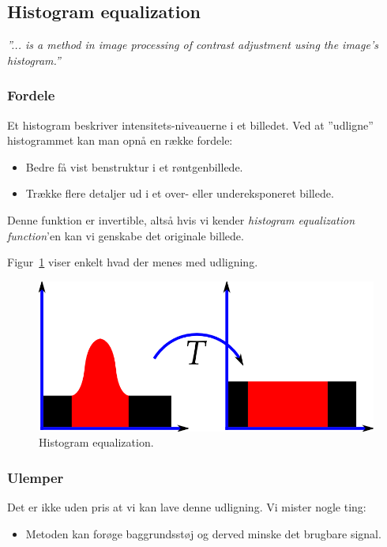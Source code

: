 \subsection{Histogram equalization}

\begin{center}
	\textit{''... is a method in image processing of contrast adjustment using the image's histogram.''}
\end{center}

\subsubsection{Fordele}

Et histogram beskriver intensitets-niveauerne i et billedet. Ved at ''udligne'' histogrammet kan man opnå en række fordele:

\begin{itemize}
	\item Bedre få vist benstruktur i et røntgenbillede.
	\item Trække flere detaljer ud i et over- eller undereksponeret billede.
\end{itemize}

Denne funktion er invertible, altså hvis vi kender \textit{histogram equalization function}'en kan vi genskabe det originale billede.

Figur~\ref{fig:histogram-eq} viser enkelt hvad der menes med udligning.

\begin{figure}[H]
	\centering
	\includegraphics[width=0.6\linewidth]{figs/spm01/histogram-eq.png}
	\caption{Histogram equalization.}
	\label{fig:histogram-eq}
\end{figure}

\subsubsection{Ulemper}
Det er ikke uden pris at vi kan lave denne udligning. Vi mister nogle ting:

\begin{itemize}
	\item Metoden kan forøge baggrundsstøj og derved minske det brugbare signal.
\end{itemize}
